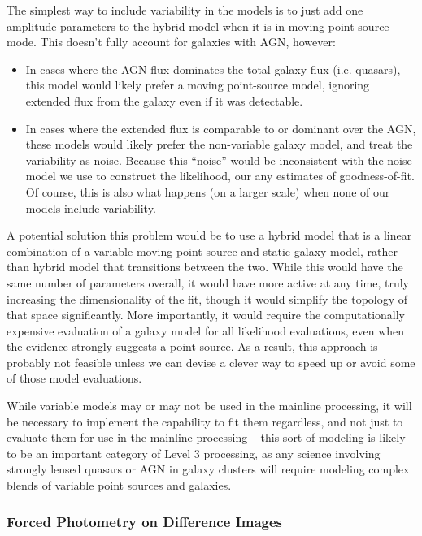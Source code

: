 \documentclass[10pt]{article}
\begin{document}
The simplest way to include variability in the models is to just add
one amplitude parameters to the hybrid model when it is in moving-point source
mode.  This doesn't fully account for galaxies with AGN, however:
\begin{itemize}
\item In cases where the AGN flux dominates the total galaxy flux (i.e.
    quasars), this model would likely prefer a moving point-source model,
    ignoring extended flux from the galaxy even if it was detectable.
\item In cases where the extended flux is comparable to or dominant over the
    AGN, these models would likely prefer the non-variable galaxy model, and
    treat the variability as noise.  Because this ``noise'' would be
    inconsistent with the noise model we use to construct the likelihood, our
    any estimates of goodness-of-fit.  Of course, this is also what happens
    (on a larger scale) when none of our models include variability.
\end{itemize}
A potential solution this problem would be to use a hybrid model that is a
linear combination of a variable moving point source and static galaxy model,
rather than hybrid model that transitions between the two.  While this would
have the same number of parameters overall, it would have more active at any
time, truly increasing the dimensionality of the fit, though it would
simplify the topology of that space significantly.  More importantly, it would
require the computationally expensive evaluation of a galaxy model for all
likelihood evaluations, even when the evidence strongly suggests a point
source.  As a result, this approach is probably not feasible unless we can
devise a clever way to speed up or avoid some of those model evaluations.

While variable models may or may not be used in the mainline processing, it
will be necessary to implement the capability to fit them regardless, and not
just to evaluate them for use in the mainline processing -- this sort of
modeling is likely to be an important category of Level 3 processing, as any
science involving strongly lensed quasars or AGN in galaxy clusters will
require modeling complex blends of variable point sources and galaxies.

\subsubsection{Forced Photometry on Difference Images}
\end{document}
